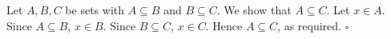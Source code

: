 Let $A, B, C$ be sets with $A \subseteq B$ and $B \subseteq C$.
We show that $A \subseteq C$.
Let $x \in A$.
Since $A \subseteq B$, $x \in B$.
Since $B \subseteq C$, $x \in C$.
Hence $A \subseteq C$, as required. \hfill$\square$